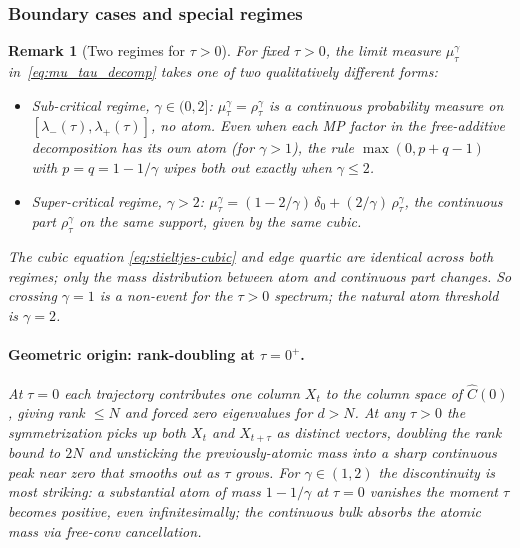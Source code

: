 \documentclass{article}
\newtheorem{remark}{Remark}
\begin{document}
\subsubsection{Boundary cases and special regimes}
\label{app:consequences}

\begin{remark}[Two regimes for $\tau > 0$]
\label{rem:two_regimes}
For fixed $\tau > 0$, the limit measure $\mu_\tau^\gamma$
in~\eqref{eq:mu_tau_decomp} takes one of two qualitatively different
forms:
\begin{itemize}[leftmargin=*,nosep]
\item \emph{Sub-critical regime, $\gamma \in (0, 2]$:}
$\mu_\tau^\gamma = \rho_\tau^\gamma$ is a continuous probability
measure on $[\lambda_-(\tau), \lambda_+(\tau)]$, no atom. Even when
each MP factor in the free-additive decomposition has its own atom
(for $\gamma > 1$), the rule $\max(0, p+q-1)$ with
$p = q = 1 - 1/\gamma$ wipes both out exactly when $\gamma \le 2$.
\item \emph{Super-critical regime, $\gamma > 2$:}
$\mu_\tau^\gamma = (1 - 2/\gamma)\,\delta_0 + (2/\gamma)\,\rho_\tau^\gamma$,
the continuous part $\rho_\tau^\gamma$ on the same support, given by
the same cubic.
\end{itemize}
The cubic equation \eqref{eq:stieltjes-cubic} and edge quartic
are identical across both regimes; only the mass distribution between
atom and continuous part changes. So crossing $\gamma = 1$ is a
non-event for the $\tau > 0$ spectrum; the natural atom threshold is
$\gamma = 2$.

\paragraph{Geometric origin: rank-doubling at $\tau = 0^+$.}
At $\tau = 0$ each trajectory contributes one column $X_t$ to the
column space of $\hat C(0)$, giving rank $\le N$ and forced zero
eigenvalues for $d > N$. At any $\tau > 0$ the symmetrization picks
up both $X_t$ and $X_{t+\tau}$ as distinct vectors, doubling the rank
bound to $2N$ and unsticking the previously-atomic mass into a sharp
continuous peak near zero that smooths out as $\tau$ grows. For
$\gamma \in (1, 2)$ the discontinuity is most striking: a substantial
atom of mass $1 - 1/\gamma$ at $\tau = 0$ vanishes the moment $\tau$
becomes positive, even infinitesimally; the continuous bulk absorbs
the atomic mass via free-conv cancellation.
\end{remark}
\end{document}
